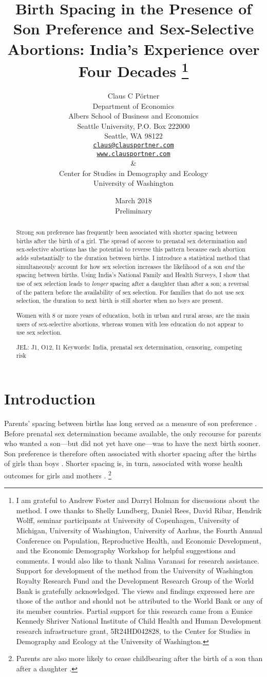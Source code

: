 \documentclass[12pt,letterpaper]{article}
\title{Birth Spacing in the Presence of Son Preference and Sex-Selective Abortions:
India's Experience over Four Decades%
\protect\thanks{%
I am grateful to Andrew Foster and Darryl Holman for discussions about the method.
I owe thanks to Shelly Lundberg, Daniel Rees, David Ribar, 
Hendrik Wolff, seminar participants at University of Copenhagen, University of Michigan, 
University of Washington, University of Aarhus, the Fourth 
Annual Conference on Population, Reproductive Health, 
and Economic Development, and the Economic Demography Workshop for helpful 
suggestions and comments.
I would also like to thank Nalina Varanasi for research assistance.
Support for development of the method from the University of Washington Royalty 
Research Fund and the Development Research Group of the World Bank is gratefully 
acknowledged.
The views and findings expressed here are those of the author and
should not be attributed to the World Bank or any of its member countries.
Partial support for this research came from a Eunice Kennedy Shriver National
Institute of Child Health and Human Development research infrastructure grant,
5R24HD042828, to the Center for Studies in Demography and Ecology at the
University of Washington.
}
}
\author{Claus C P\"ortner\\
    Department of Economics\\
    Albers School of Business and Economics\\
    Seattle University, P.O. Box 222000\\
    Seattle, WA 98122\\
    \href{mailto:claus@clausportner.com}{\texttt{claus@clausportner.com}}\\
    \href{http://www.clausportner.com}{\texttt{www.clausportner.com}}\\
    \& \\
    Center for Studies in Demography and Ecology \\
    University of Washington\\ \vspace{2cm}
    }
\date{March 2018\\
\bigskip
Preliminary}
\begin{document}
\graphicspath{{../figures/}}

\setcounter{page}{-1}
\maketitle
\thispagestyle{empty}



\newpage
\thispagestyle{empty}
\doublespacing

\begin{abstract}

\noindent 

Strong son preference has frequently been associated with shorter 
spacing between births after the birth of a girl.
The spread of access to prenatal sex determination and 
sex-selective abortions has the potential to reverse this pattern
because each abortion adds substantially to the duration between births.
I introduce a statistical method that simultaneously account for how sex 
selection increases the likelihood of a son \emph{and} the spacing between births.
Using India's National Family and Health Surveys,
I show that use of sex selection leads to \emph{longer} spacing after a daughter 
than after a son; a reversal of the pattern before the availability of sex selection.
For families that do not use sex selection, the duration to next birth is still 
shorter when no boys are present.

Women with 8 or more years of education, both in urban and rural areas, are 
the main users of sex-selective abortions, whereas women with less education 
do not appear to use sex selection.


\noindent JEL: J1, O12, I1
\noindent Keywords: India, prenatal sex determination, censoring, competing risk
\end{abstract}

\newpage



\section{Introduction\label{sec:intro}}

Parents' spacing between births has long served as a measure of son preference 
\citep{Leung1988}.
Before prenatal sex determination became available, the only recourse for 
parents who wanted a son---but did not yet have one---was to have the next 
birth sooner.
Son preference is therefore often associated with shorter spacing after the 
births of girls than boys 
\citep{Das1987,Rahman1993,Pong1994,Haughton1996,Arnold1997,Soest2012,Rossi2015}.
Shorter spacing is, in turn, associated with worse health outcomes for girls 
and mothers 
\citep{arnold98,Conde-Agudelo2000,Whitworth2002,Razzaque2005,Rutstein2005,Conde-Agudelo2006}.%
\footnote{
Parents are also more likely to cease childbearing after the birth of 
a son than after a daughter 
\citep{ben-porath76b,Das1987,Arnold1997,clark00,filmer09,Basu2010,Altindag2016}.
}
\end{document}
